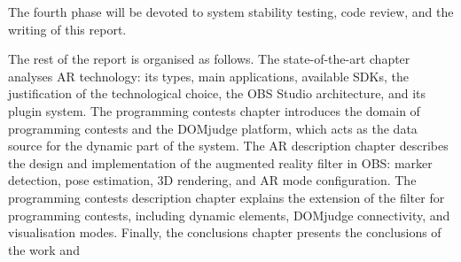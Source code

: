 The fourth phase will be devoted to system stability testing, code review, and the writing of this report.

The rest of the report is organised as follows. The state-of-the-art chapter analyses AR technology: its types, main applications, available SDKs, the justification of the technological choice, the OBS Studio architecture, and its plugin system. The programming contests chapter introduces the domain of programming contests and the DOMjudge platform, which acts as the data source for the dynamic part of the system. The AR description chapter describes the design and implementation of the augmented reality filter in OBS: marker detection, pose estimation, 3D rendering, and AR mode configuration. The programming contests description chapter explains the extension of the filter for programming contests, including dynamic elements, DOMjudge connectivity, and visualisation modes. Finally, the conclusions chapter presents the conclusions of the work and